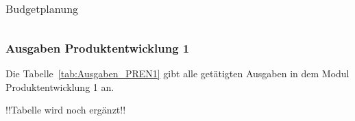 \documentclass[main.tex]{subfiles} %
\begin{document}
\begin{landscape}
\begin{table}[h]
{\begin{tabular}{|c|c|c|c|c|c|c|}
    \end{tabular}
    }

    \caption{Budgetplanung}
    \label{tab:Budgetplanung}
\end{table}

\subsubsection{Ausgaben Produktentwicklung 1}
Die Tabelle~\ref{tab:Ausgaben_PREN1} gibt alle getätigten Ausgaben in dem Modul Produktentwicklung 1 an.

!!Tabelle wird noch ergänzt!!


\begin{table}[h] 
                     
    \centering
    \caption{Ausgaben PREN1}
    \label{tab:Ausgaben_PREN1}
\end{table}

\end{landscape}
\end{document}
